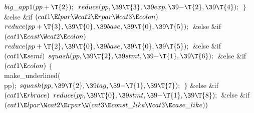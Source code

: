 ${}\\{big\_app1}(\\{pp}+\T{2});{}$\6
${}\\{reduce}(\\{pp},\39\T{3},\39\\{exp},\39{-}\T{2},\39\T{4});{}$\6
\4${}\}{}$\2\6
\&{else} \&{if} ${}(\\{cat1}\E\\{lpar}\W\\{cat2}\E\\{rpar}\W\\{cat3}\E%
\\{colon}){}$\1\5
${}\\{reduce}(\\{pp}+\T{3},\39\T{0},\39\\{base},\39\T{0},\39\T{5});{}$\2\6
\&{else} \&{if} ${}(\\{cat1}\E\\{cast}\W\\{cat2}\E\\{colon}){}$\1\5
${}\\{reduce}(\\{pp}+\T{2},\39\T{0},\39\\{base},\39\T{0},\39\T{5});{}$\2\6
\&{else} \&{if} ${}(\\{cat1}\E\\{semi}){}$\1\5
${}\\{squash}(\\{pp},\39\T{2},\39\\{stmt},\39{-}\T{1},\39\T{6});{}$\2\6
\&{else} \&{if} ${}(\\{cat1}\E\\{colon}){}$\5
${}\{{}$\1\6
\\{make\_underlined}(\\{pp});\6
${}\\{squash}(\\{pp},\39\T{2},\39\\{tag},\39{-}\T{1},\39\T{7});{}$\6
\4${}\}{}$\2\6
\&{else} \&{if} ${}(\\{cat1}\E\\{rbrace}){}$\1\5
${}\\{reduce}(\\{pp},\39\T{0},\39\\{stmt},\39{-}\T{1},\39\T{8});{}$\2\6
\&{else} \&{if} ${}(\\{cat1}\E\\{lpar}\W\\{cat2}\E\\{rpar}\W(\\{cat3}\E\\{const%
\_like}\V\\{cat3}\E\\{case\_like})){}$\5
